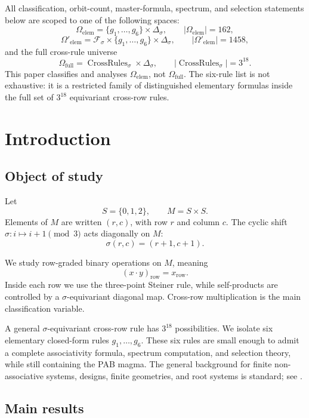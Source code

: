 \documentclass[11pt]{article}
\begin{document}
All classification, orbit-count, master-formula, spectrum, and selection
statements below are scoped to one of the following spaces:
\[
\Omega_{\mathrm{elem}}=\{g_1,\ldots,g_6\}\times\Delta_\sigma,
\qquad |\Omega_{\mathrm{elem}}|=162,
\]
\[
\Omega'_{\mathrm{elem}}=\mathcal F_\sigma\times\{g_1,\ldots,g_6\}\times\Delta_\sigma,
\qquad |\Omega'_{\mathrm{elem}}|=1458,
\]
and the full cross-rule universe
\[
\Omega_{\mathrm{full}}=\operatorname{CrossRules}_\sigma\times\Delta_\sigma,
\qquad |\operatorname{CrossRules}_\sigma|=3^{18}.
\]
This paper classifies and analyses \(\Omega_{\mathrm{elem}}\), not
\(\Omega_{\mathrm{full}}\). The six-rule list is not exhaustive: it is a restricted
family of distinguished elementary formulas inside the full set of
\(3^{18}\) equivariant cross-row rules.



\section{Introduction}

\subsection{Object of study}

Let
\[
S=\{0,1,2\},\qquad M=S\times S.
\]
Elements of \(M\) are written \((r,c)\), with row \(r\) and column \(c\). The cyclic
shift \(\sigma:i\mapsto i+1\pmod 3\) acts diagonally on \(M\):
\[
\sigma(r,c)=(r+1,c+1).
\]

We study row-graded binary operations on \(M\), meaning
\[
(x\cdot y)_{\mathrm{row}}=x_{\mathrm{row}}.
\]
Inside each row we use the three-point Steiner rule, while self-products are
controlled by a \(\sigma\)-equivariant diagonal map. Cross-row multiplication is
the main classification variable.

A general \(\sigma\)-equivariant cross-row rule has \(3^{18}\) possibilities. We
isolate six elementary closed-form rules \(g_1,\ldots,g_6\). These six rules are
small enough to admit a complete associativity formula, spectrum computation,
and selection theory, while still containing the PAB magma. The general
background for finite non-associative systems, designs, finite geometries, and
root systems is standard; see \cite{bruck1958,denes1974,beth1999,colbourn2006,dembowski1968}.

\subsection{Main results}
\end{document}

